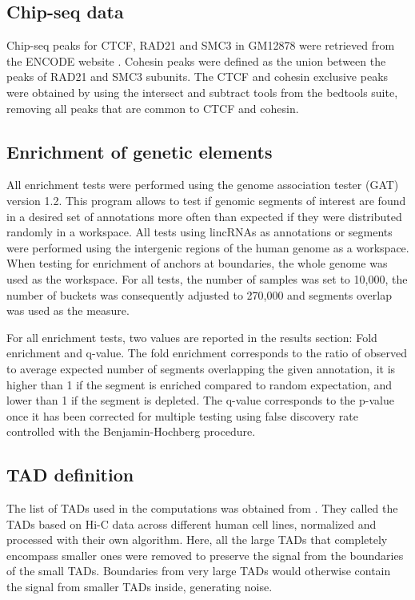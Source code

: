 \documentclass[11pt,a4paper]{report}
\begin{document}
\subsection*{Chip-seq data}

Chip-seq peaks for CTCF, RAD21 and SMC3 in GM12878 were retrieved from the ENCODE website \cite{ENCODEProject2012}⁠. Cohesin peaks were defined as the union between the peaks of RAD21 and SMC3 subunits. The CTCF and cohesin exclusive peaks were obtained by using the intersect and subtract tools from the bedtools suite, removing all peaks that are common to CTCF and cohesin.

\subsection*{Enrichment of genetic elements}

All enrichment tests were performed using the genome association tester (GAT) \cite{Heger2013}⁠ version 1.2. This program allows to test if genomic segments of interest are found in a desired set of annotations more often than expected if they were distributed randomly in a workspace. All tests using lincRNAs as annotations or segments were performed using the intergenic regions of the human genome as a workspace. When testing for enrichment of anchors at boundaries, the whole genome was used as the workspace. For all tests, the number of samples was set to 10,000, the number of buckets was consequently adjusted to 270,000 and segments overlap was used as the measure.

For all enrichment tests, two values are reported in the results section: Fold enrichment and q-value. The fold enrichment corresponds to the ratio of observed to average expected number of segments overlapping the given annotation, it is higher than 1 if the segment is enriched compared to random expectation, and lower than 1 if the segment is depleted. The q-value corresponds to the p-value once it has been corrected for multiple testing using false discovery rate controlled with the Benjamin-Hochberg procedure.

\subsection*{TAD definition}

The list of TADs used in the computations was obtained from \cite{Rao2014}. They called the TADs based on Hi-C data across different human cell lines, normalized and processed with their own algorithm. Here, all the large TADs that completely encompass smaller ones were removed to preserve the signal from the boundaries of the small TADs. Boundaries from very large TADs would otherwise contain the signal from smaller TADs inside, generating noise.
\end{document}
